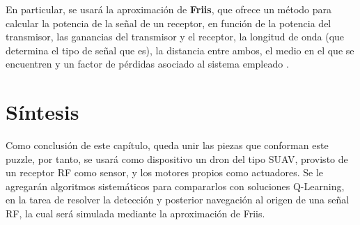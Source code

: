 En particular, se usará la aproximación de \textbf{Friis}, que ofrece un método para calcular la potencia de la señal de un receptor, en función de la potencia del transmisor, las ganancias del transmisor y el receptor, la longitud de onda (que determina el tipo de señal que es), la distancia entre ambos, el medio en el que se encuentren y un factor de pérdidas asociado al sistema empleado \cite{friis-1} \cite{friis-2} \cite{friis-3}.\\

\section{Síntesis}
\label{subsec:sintesis}

Como conclusión de este capítulo, queda unir las piezas que conforman este puzzle, por tanto, se usará como dispositivo un dron del tipo \ac{SUAV}, provisto de un receptor \ac{RF} como sensor, y los motores propios como actuadores. Se le agregarán algoritmos sistemáticos para compararlos con soluciones Q-Learning, en la tarea de resolver la detección y posterior navegación al origen de una señal \ac{RF}, la cual será simulada mediante la aproximación de Friis.\\